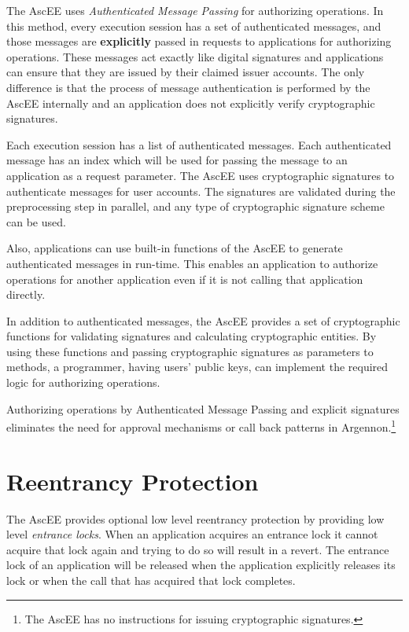 The AscEE uses \emph{Authenticated Message Passing} for authorizing operations. In this method, every execution
session has a set of authenticated messages, and those messages are \textbf{explicitly} passed in requests to
applications for authorizing operations. These messages act exactly like digital signatures and applications can
ensure that they are issued by their claimed issuer accounts. The only difference is that the process of
message authentication is performed by the AscEE internally and an application does not explicitly verify cryptographic
signatures.

Each execution session has a list of authenticated messages. Each authenticated message has an index which will be
used for passing the message to an application as a request parameter. The AscEE uses cryptographic signatures to
authenticate messages for user accounts. The signatures are validated during the
preprocessing step in parallel, and any type of cryptographic signature scheme can be used.

Also, applications can use built-in functions of the AscEE to generate authenticated messages in run-time.
This enables an application to authorize operations for another application even if it is not calling that
application directly.

In addition to authenticated messages, the AscEE provides a set of
cryptographic functions for validating signatures and calculating cryptographic entities. By using these functions and
passing cryptographic signatures as parameters to methods, a programmer, having users' public keys, can implement
the required logic for authorizing operations.

Authorizing operations by Authenticated Message Passing and explicit signatures eliminates the need for approval
mechanisms or call back patterns in Argennon.\footnote{The AscEE has no instructions for issuing cryptographic
signatures.}


\section{Reentrancy Protection}\label{sec:reentrancy}

The AscEE provides optional low level reentrancy protection by providing low
level \emph{entrance locks}. When an application acquires an entrance lock it cannot acquire that lock again and trying
to do so will result in a revert. The entrance lock of an application will be released when the application explicitly
releases its lock or when the call that has acquired that lock completes.

